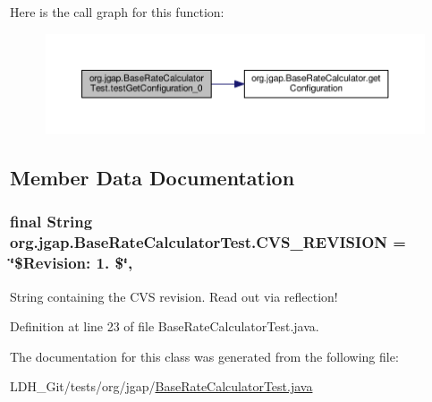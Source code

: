 Here is the call graph for this function\-:
\nopagebreak
\begin{figure}[H]
\begin{center}
\leavevmode
\includegraphics[width=350pt]{classorg_1_1jgap_1_1_base_rate_calculator_test_a1d5ecacf681bfadcb38d2a3f6a0bb770_cgraph}
\end{center}
\end{figure}




\subsection{Member Data Documentation}
\hypertarget{classorg_1_1jgap_1_1_base_rate_calculator_test_adcd369bbbf536ed1839b8475a633d9ea}{
\subsubsection[{C\-V\-S\-\_\-\-R\-E\-V\-I\-S\-I\-O\-N}]{\setlength{\rightskip}{0pt plus 5cm}final String org.\-jgap.\-Base\-Rate\-Calculator\-Test.\-C\-V\-S\-\_\-\-R\-E\-V\-I\-S\-I\-O\-N = \char`\"{}\$Revision\-: 1. \$\char`\"{}\hspace{0.3cm}{\ttfamily [static]}, {\ttfamily [private]}}}\label{classorg_1_1jgap_1_1_base_rate_calculator_test_adcd369bbbf536ed1839b8475a633d9ea}
String containing the C\-V\-S revision. Read out via reflection! 

Definition at line 23 of file Base\-Rate\-Calculator\-Test.\-java.



The documentation for this class was generated from the following file\-:\begin{DoxyCompactItemize}
\item 
L\-D\-H\-\_\-\-Git/tests/org/jgap/\hyperlink{_base_rate_calculator_test_8java}{Base\-Rate\-Calculator\-Test.\-java}\end{DoxyCompactItemize}
